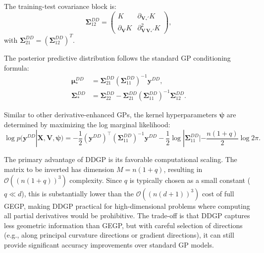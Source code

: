\documentclass[12pt]{article}
\begin{document}
The training-test covariance block is:
\begin{equation}
	\label{eqn:ddgp_bg_S12}
	\boldsymbol{\Sigma}_{12}^{DD} =
	\begin{pmatrix}
		K & \partial_{\mathbf{V}_*'} K \\
		\partial_{\mathbf{V}} K & \partial^2_{\mathbf{V}\,\mathbf{V}_*'} K
	\end{pmatrix},
\end{equation}
with $\boldsymbol{\Sigma}_{21}^{DD} = (\boldsymbol{\Sigma}_{12}^{DD})^T$.

The posterior predictive distribution follows the standard GP conditioning formula:
\begin{equation}
	\label{eqn:ddgp_bg_posterior}
	\begin{split}
		\boldsymbol{\mu}^{DD}_{*} &= \boldsymbol{\Sigma}_{21}^{DD} (\boldsymbol{\Sigma}_{11}^{DD})^{-1} \mathbf{y}^{DD}, \\
		\boldsymbol{\Sigma}^{DD}_{*} &=  \boldsymbol{\Sigma}_{22}^{DD} - \boldsymbol{\Sigma}_{21}^{DD} (\boldsymbol{\Sigma}_{11}^{DD})^{-1} \boldsymbol{\Sigma}_{12}^{DD}.
	\end{split}
\end{equation}

Similar to other derivative-enhanced GPs, the kernel hyperparameters $\boldsymbol{\psi}$ are determined by maximizing the log marginal likelihood:
\begin{equation}
	\label{eqn:ddgp_bg_mll}
	\log p(\mathbf{y}^{DD}|\mathbf{X}, \mathbf{V}, \boldsymbol{\psi}) = -\frac{1}{2} (\mathbf{y}^{DD})^\top (\boldsymbol{\Sigma}_{11}^{DD})^{-1} \mathbf{y}^{DD} - \frac{1}{2}\log|\boldsymbol{\Sigma}_{11}^{DD}| - \frac{n(1+q)}{2}\log 2\pi.
\end{equation}

The primary advantage of DDGP is its favorable computational scaling. The matrix to be inverted has dimension $M = n(1+q)$, resulting in $\mathcal{O}((n(1+q))^3)$ complexity. Since $q$ is typically chosen as a small constant ($q \ll d$), this is substantially lower than the $\mathcal{O}((n(d+1))^3)$ cost of full GEGP, making DDGP practical for high-dimensional problems where computing all partial derivatives would be prohibitive. The trade-off is that DDGP captures less geometric information than GEGP, but with careful selection of directions (e.g., along principal curvature directions or gradient directions), it can still provide significant accuracy improvements over standard GP models.
\end{document}
